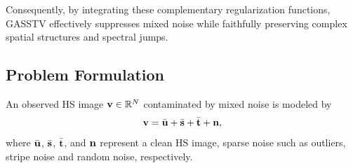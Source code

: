 Consequently, by integrating these complementary regularization functions, GASSTV effectively suppresses mixed noise while faithfully preserving complex spatial structures and spectral jumps.






\subsection{Problem Formulation}
\label{subsec:ProbForm}
An observed HS image $\mathbf{v} \in \mathbb{R}^{N}$ contaminated by mixed noise is modeled by
\begin{equation}
    \label{eq:ObsvModel}
    \mathbf{v} = \bar{\mathbf{u}} + \bar{\mathbf{s}} + \bar{\mathbf{t}} + \mathbf{n},
\end{equation}
where $\bar{\mathbf{u}}$, $\bar{\mathbf{s}}$, $\bar{\mathbf{t}}$, and $\mathbf{n}$ represent a clean HS image, sparse noise such as outliers, stripe noise and random noise, respectively.

